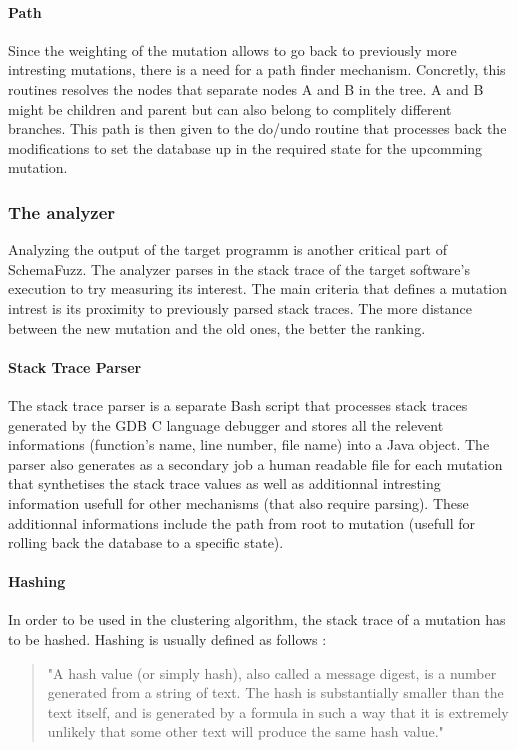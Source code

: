 \documentclass{article}
\begin{document}
				\paragraph{Path}
Since the weighting of the mutation allows to go back to previously more intresting mutations, 
there is a need for a path finder mechanism. Concretly, this routines resolves the nodes that separate nodes A and B in the tree. A and B might be children and parent but can also belong to complitely different branches. This path is then given to the do/undo routine that processes back the modifications to set the database up in the required state for the upcomming mutation. 
			\subsubsection{The analyzer}
Analyzing the output of the target programm is another critical part of SchemaFuzz. The analyzer parses in the stack trace of the target software's execution to try measuring its interest. The main criteria that defines a mutation intrest is its proximity to previously parsed stack traces. The more distance between the new mutation and the old ones, the better the ranking. 
				\paragraph{Stack Trace Parser}
The stack trace parser is a separate Bash script that processes stack traces generated by the GDB C language debugger and stores all the relevent informations (function's name, line number, file name) into a Java object. The parser also generates as a secondary job a human readable file for each mutation that synthetises the stack trace values as well as additionnal intresting information usefull for other mechanisms (that also require parsing). These additionnal informations include the path from root to mutation (usefull for rolling back the database to a specific state).
				\paragraph{Hashing}
In order to be used in the clustering algorithm, the stack trace of a mutation has to be hashed.
Hashing is usually defined as follows : 
				\begin{quotation}
"A hash value (or simply hash), also called a message digest, is a number generated from a string of text. The hash is substantially smaller than the text itself, and is generated by a formula in such a way that it is extremely unlikely that some other text will produce the same hash value."
				\end{quotation}
				
\end{document}
